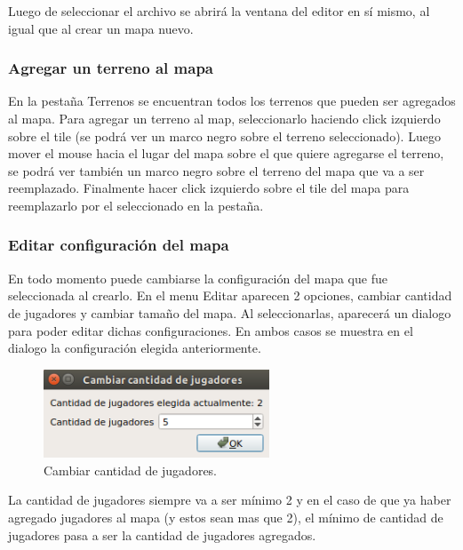 \documentclass[titlepage,a4paper,12pt]{article}
\begin{document}
Luego de seleccionar el archivo se abrirá la ventana del editor en sí mismo, al igual que al crear un mapa nuevo.\\

\subsubsection{Agregar un terreno al mapa}

En la pestaña Terrenos se encuentran todos los terrenos que pueden ser agregados al mapa. Para agregar un terreno al map, seleccionarlo haciendo click izquierdo sobre el tile (se podrá ver un marco negro sobre el terreno seleccionado). Luego mover el mouse hacia el lugar del mapa sobre el que quiere agregarse el terreno, se podrá ver también un marco negro sobre el terreno del mapa que va a ser reemplazado. Finalmente hacer click izquierdo sobre el tile del mapa para reemplazarlo por el seleccionado en la pestaña.

\subsubsection{Editar configuración del mapa}

En todo momento puede cambiarse la configuración del mapa que fue seleccionada al crearlo. En el menu Editar aparecen 2 opciones, cambiar cantidad de jugadores y cambiar tamaño del mapa. Al seleccionarlas, aparecerá un dialogo para poder editar dichas configuraciones. En ambos casos se muestra en el dialogo la configuración elegida anteriormente.\\

\begin{figure}[H]
	\centering
	\includegraphics[width=0.6\textwidth]{../imagenes/cambiar_jugadores.png}
	\caption{\label{fig:menu_editor} Cambiar cantidad de jugadores.}
\end{figure}

La cantidad de jugadores siempre va a ser mínimo 2 y en el caso de que ya haber agregado jugadores al mapa (y estos sean mas que 2), el mínimo de cantidad de jugadores pasa a ser la cantidad de jugadores agregados.\\
\end{document}
